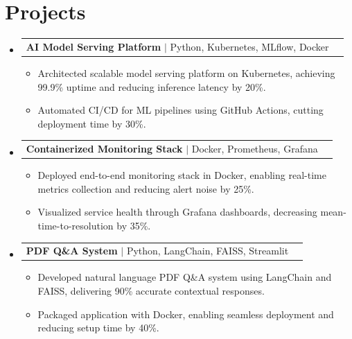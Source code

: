 \documentclass[letterpaper,11pt]{article}
\makeatletter
\newcommand{\resumeItem}[1]{
  \item\footnotesize{
    {#1 \vspace{-2pt}}
  }
}
\newcommand{\resumeProjectHeading}[2]{
    \item
    \begin{tabular*}{1.001\textwidth}{l@{\extracolsep{\fill}}r}
      \small#1 & \textbf{\small #2}\\
    \end{tabular*}\vspace{-7pt}
}
\newcommand{\resumeSubHeadingListStart}{\begin{itemize}[leftmargin=0pt, label={}]}
\newcommand{\resumeSubHeadingListEnd}{\end{itemize}}
\newcommand{\resumeItemListStart}{\begin{itemize}[leftmargin=*]}
\newcommand{\resumeItemListEnd}{\end{itemize}\vspace{-5pt}}
\makeatother
\begin{document}
\section{Projects}
    \vspace{-5pt}
    \resumeSubHeadingListStart

      \resumeProjectHeading
          {\textbf{AI Model Serving Platform} $|$ Python, Kubernetes, MLflow, Docker}{ }
        \resumeItemListStart
            \resumeItem{Architected scalable model serving platform on Kubernetes, achieving 99.9\% uptime and reducing inference latency by 20\%.}
            \resumeItem{Automated CI/CD for ML pipelines using GitHub Actions, cutting deployment time by 30\%.}
        \resumeItemListEnd
        \vspace{-12pt}

      \resumeProjectHeading
          {\textbf{Containerized Monitoring Stack} $|$ Docker, Prometheus, Grafana}{ }
        \resumeItemListStart
            \resumeItem{Deployed end-to-end monitoring stack in Docker, enabling real-time metrics collection and reducing alert noise by 25\%.}
            \resumeItem{Visualized service health through Grafana dashboards, decreasing mean-time-to-resolution by 35\%.}
        \resumeItemListEnd
        \vspace{-12pt}

      \resumeProjectHeading
          {\textbf{PDF Q\&A System} $|$ Python, LangChain, FAISS, Streamlit}{ }
        \resumeItemListStart
            \resumeItem{Developed natural language PDF Q\&A system using LangChain and FAISS, delivering 90\% accurate contextual responses.}
            \resumeItem{Packaged application with Docker, enabling seamless deployment and reducing setup time by 40\%.}
        \resumeItemListEnd

    \resumeSubHeadingListEnd
\end{document}
